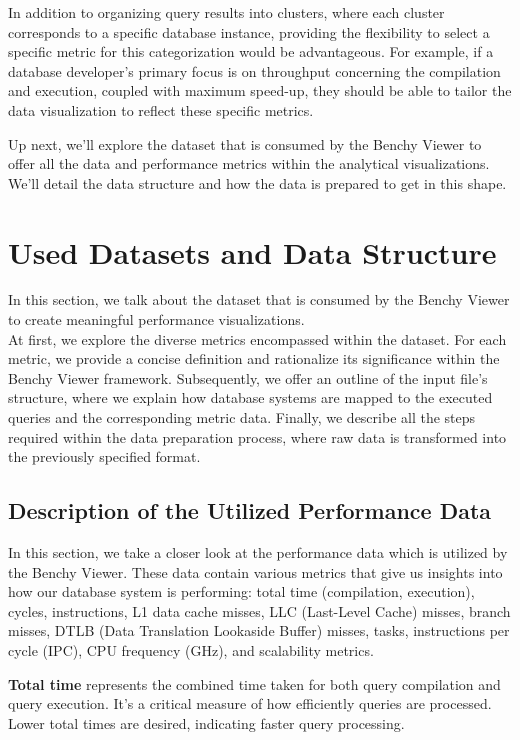 In addition to organizing query results into clusters, where each cluster corresponds to a specific database instance, providing the flexibility to select a specific metric for this categorization would be advantageous. For example, if a database developer's primary focus is on throughput concerning the compilation and execution, coupled with maximum speed-up, they should be able to tailor the data visualization to reflect these specific metrics.

Up next, we'll explore the dataset that is consumed by the Benchy Viewer to offer all the data and performance metrics within the analytical visualizations. We'll detail the data structure and how the data is prepared to get in this shape.

\section{Used Datasets and Data Structure}
In this section, we talk about the dataset that is consumed by the Benchy Viewer to create meaningful performance visualizations.\\
At first, we explore the diverse metrics encompassed within the dataset. For each metric, we provide a concise definition and rationalize its significance within the Benchy Viewer framework. Subsequently,  we offer an outline of the input file's structure, where we explain how database systems are mapped to the executed queries and the corresponding metric data. Finally, we describe all the steps required within the data preparation process, where raw data is transformed into the previously specified format.

\subsection{Description of the Utilized Performance Data}
In this section, we take a closer look at the performance data which is utilized by the Benchy Viewer. These data contain various metrics that give us insights into how our database system is performing: total time (compilation, execution), cycles, instructions, L1 data cache misses, LLC (Last-Level Cache) misses, branch misses, DTLB (Data Translation Lookaside Buffer) misses, tasks, instructions per cycle (IPC), CPU frequency (GHz), and scalability metrics. 

\textbf{Total time} represents the combined time taken for both query compilation and query execution. It's a critical measure of how efficiently queries are processed. Lower total times are desired, indicating faster query processing.

